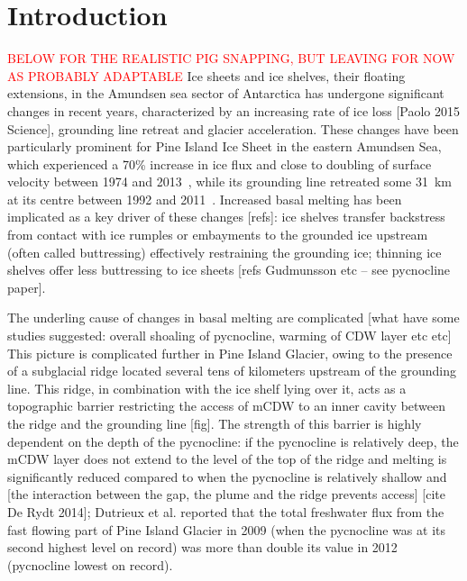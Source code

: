 \documentclass[draft]{agujournal2019}
\newcommand{\red}[1]{\textcolor{red}{#1}}
\begin{document}
%
%
\section{Introduction}
\red{BELOW FOR THE REALISTIC PIG SNAPPING, BUT LEAVING FOR NOW AS PROBABLY ADAPTABLE}
Ice sheets and ice shelves, their floating extensions, in the Amundsen sea sector of Antarctica has undergone significant changes in recent years, characterized by an increasing rate of ice loss [Paolo 2015 Science], grounding line retreat and glacier acceleration. These changes have been particularly prominent for Pine Island Ice Sheet in the eastern Amundsen Sea, which experienced a 70\% increase in ice flux and close to doubling of surface velocity between 1974 and 2013~\cite{Mouginot2014GRL}, while its grounding line retreated some 31~km at its centre between 1992 and 2011~\cite{Rignot2014GRL}. Increased basal melting has been implicated as a key driver of these changes [refs]: ice shelves transfer backstress from contact with ice rumples or embayments to the grounded ice upstream (often called buttressing) effectively restraining the grounding ice; thinning ice shelves offer less buttressing to ice sheets [refs Gudmunsson etc -- see pycnocline paper].

The underling cause of changes in basal melting are complicated [what have some studies suggested: overall shoaling of pycnocline, warming of CDW layer etc etc] This picture is complicated further in Pine Island Glacier, owing to the presence of a subglacial ridge located several tens of kilometers upstream of the grounding line. This ridge, in combination with the ice shelf lying over it, acts as a topographic barrier restricting the access of mCDW to an inner cavity between the ridge and the grounding line [fig]. The strength of this barrier is highly dependent on the depth of the pycnocline: if the pycnocline is relatively deep, the mCDW layer does not extend to the level of the top of the ridge and melting is significantly reduced compared to when the pycnocline is relatively shallow  and [the interaction between the gap, the plume and the ridge prevents access] [cite De Rydt 2014]; Dutrieux et al. reported that the total freshwater flux from the fast flowing part of Pine Island Glacier in 2009 (when the pycnocline was at its second highest level on record) was more than double its value in 2012 (pycnocline lowest on record).
\end{document}
